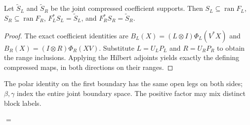 \begin{theorem}
    \label{thm:mpo_joint_cropped_polar_support}
    Let $\widetilde S_L$ and $\widetilde S_R$ be the joint compressed
    coefficient supports. Then
    $S_L\subseteq\operatorname{ran}F_L$,
    $S_R\subseteq\operatorname{ran}F_R$,
    $F_L^*S_L=\widetilde S_L$, and $F_R^*S_R=\widetilde S_R$.
\end{theorem}
\begin{proof}
    The exact coefficient identities are
    $B_L(X)=(L\otimes I)\Phi_L(V^*X)$ and
    $B_R(X)=(I\otimes R)\Phi_R(XV)$.
    Substitute $L=U_LP_L$ and $R=U_RP_R$ to obtain the range
    inclusions. Applying the Hilbert adjoints yields exactly the
    defining compressed maps, in both directions on their ranges.
\end{proof}

The polar identity on the first boundary has the same open legs on
both sides; $\beta,\gamma$ index the entire joint boundary space.
The positive factor may mix distinct block labels.
\begin{tenkzequation}
    \tenkzkernel
    \begin{tenkz}[rows={wire}, cols=1, bonds=none]
    \end{tenkz}
    \quad $=$ \quad
    \begin{tenkz}[rows={wire}, cols=2, bonds=none]
    \end{tenkz}
\end{tenkzequation}

